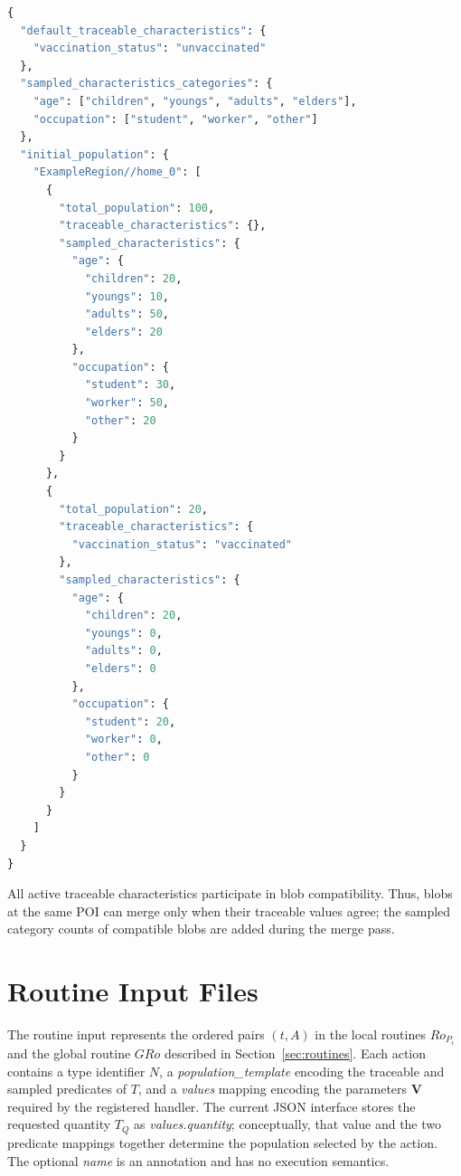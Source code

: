 \begin{lstlisting}[language={Python},
caption={Example of a population input file.},
captionpos=b, label={lst:population_description}, basicstyle=\scriptsize]
{
  "default_traceable_characteristics": {
    "vaccination_status": "unvaccinated"
  },
  "sampled_characteristics_categories": {
    "age": ["children", "youngs", "adults", "elders"],
    "occupation": ["student", "worker", "other"]
  },
  "initial_population": {
    "ExampleRegion//home_0": [
      {
        "total_population": 100,
        "traceable_characteristics": {},
        "sampled_characteristics": {
          "age": {
            "children": 20,
            "youngs": 10,
            "adults": 50,
            "elders": 20
          },
          "occupation": {
            "student": 30,
            "worker": 50,
            "other": 20
          }
        }
      },
      {
        "total_population": 20,
        "traceable_characteristics": {
          "vaccination_status": "vaccinated"
        },
        "sampled_characteristics": {
          "age": {
            "children": 20,
            "youngs": 0,
            "adults": 0,
            "elders": 0
          },
          "occupation": {
            "student": 20,
            "worker": 0,
            "other": 0
          }
        }
      }
    ]
  }
}
\end{lstlisting}

All active traceable characteristics participate in blob compatibility. Thus,
blobs at the same POI can merge only when their traceable values agree; the
sampled category counts of compatible blobs are added during the merge pass.


\section{Routine Input Files}
\label{app:input_routine}

The routine input represents the ordered pairs $(t,A)$ in the local routines
$Ro_{P_i}$ and the global routine $GRo$ described in
Section~\ref{sec:routines}. Each action contains a type identifier $N$, a
\textit{population\_template} encoding the traceable and sampled predicates of
$T$, and a \textit{values} mapping encoding the parameters $\bm{V}$ required by
the registered handler. The current JSON interface stores the requested
quantity $T_Q$ as \textit{values.quantity}; conceptually, that value and the
two predicate mappings together determine the population selected by the
action. The optional \textit{name} is an annotation and has no execution
semantics.

